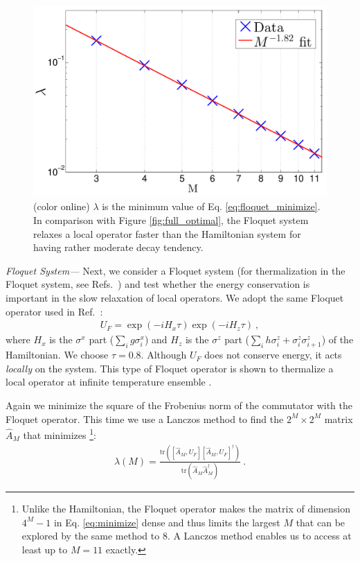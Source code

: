 \documentclass[twocolumn,superscriptaddress, prb]{revtex4-1}
\begin{document}
\begin{figure}
\includegraphics[width=1.0\linewidth]{semi_infinite_floquet_only.pdf}
\centering
\caption{(color online) $\lambda$ is the minimum value of Eq. \eqref{eq:floquet_minimize}. In comparison with Figure \ref{fig:full_optimal}, the Floquet system relaxes a local operator faster than the Hamiltonian system for having rather moderate decay tendency.
}
\label{fig:floquet}
\end{figure}

{\it Floquet System---}
Next, we consider a Floquet system (for thermalization in the Floquet system, see Refs.~) and test whether the energy conservation is important in the slow relaxation of local operators.
We adopt the same Floquet operator used in Ref.~:
\begin{align}
U_F = \exp(-i H_x \tau) \exp(-i H_z \tau) ~,
\end{align}
where $H_x$ is the $\sigma^x$ part ($\sum_i g \sigma^x_i$) and $H_z$ is the $\sigma^z$ part ($\sum_i h \sigma^z_i +\sigma^z_i \sigma^z_{i+1}$)
of the Hamiltonian. We choose $\tau = 0.8$.
Although $U_F$ does not conserve energy, it acts {\it locally} on the system.
This type of Floquet operator is shown to thermalize a local operator at infinite temperature ensemble \cite{Kim_ETH,Prosen:2002}.

Again we minimize the square of the Frobenius norm of the commutator with the Floquet operator.
This time we use a Lanczos method to find the $2^M \times 2^M$ matrix $\hat{A}_M$
that minimizes \footnote{Unlike the Hamiltonian, the Floquet operator makes the matrix of dimension $4^M-1$ in Eq. \eqref{eq:minimize} dense and thus
limits the largest $M$ that can be explored by the same method to 8. A Lanczos method enables us to access at least up to $M = 11$ exactly.}:
\begin{align}\label{eq:floquet_minimize}
\lambda(M) = \frac{\mathrm{tr}([\hat{A}_M,U_F][\hat{A}_M,U_F]^\dag)}{\mathrm{tr}(\hat{A}_M\hat{A}_M^\dag)} ~.
\end{align}
\end{document}

